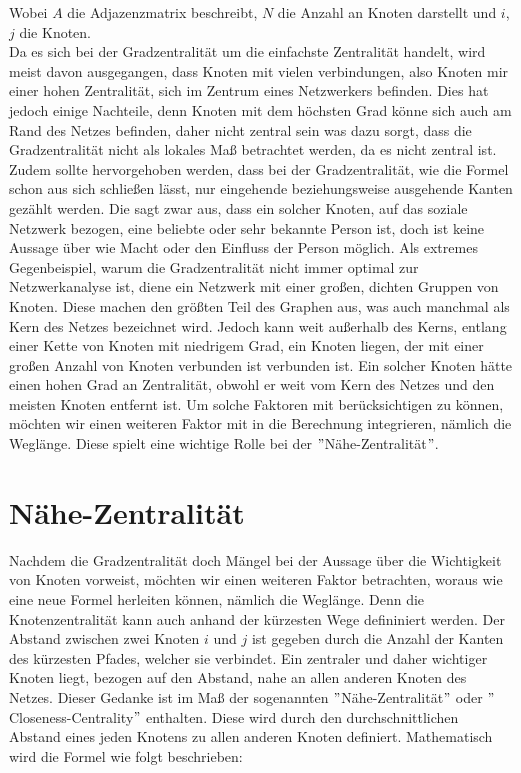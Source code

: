 Wobei $A$ die Adjazenzmatrix beschreibt, $N$ die Anzahl an Knoten darstellt und $i$, $j$ die Knoten. \\
Da es sich bei der Gradzentralität um die einfachste Zentralität handelt, wird meist davon ausgegangen, dass Knoten mit vielen verbindungen, also Knoten mir einer hohen Zentralität, sich im Zentrum eines Netzwerkers befinden. Dies hat jedoch einige Nachteile, denn Knoten mit dem höchsten Grad könne sich auch am Rand des Netzes befinden, daher nicht zentral sein was dazu sorgt, dass die Gradzentralität nicht als lokales Maß betrachtet werden, da es nicht zentral ist. Zudem sollte hervorgehoben werden, dass bei der Gradzentralität, wie die Formel schon aus sich schließen lässt, nur eingehende beziehungsweise ausgehende Kanten gezählt werden. Die sagt zwar aus, dass ein solcher Knoten, auf das soziale Netzwerk bezogen, eine beliebte oder sehr bekannte Person ist, doch ist keine Aussage über wie Macht oder den Einfluss der Person möglich. Als extremes Gegenbeispiel, warum die Gradzentralität nicht immer optimal zur Netzwerkanalyse ist, diene ein Netzwerk mit einer großen, dichten Gruppen von Knoten. Diese machen den größten Teil des Graphen aus, was auch manchmal als Kern des Netzes bezeichnet wird. Jedoch kann weit außerhalb des Kerns, entlang einer Kette von Knoten mit niedrigem Grad, ein Knoten liegen, der mit einer großen Anzahl von Knoten verbunden ist
verbunden ist. Ein solcher Knoten hätte einen hohen Grad an
Zentralität, obwohl er weit vom Kern des Netzes und den meisten Knoten entfernt ist. 
Um solche Faktoren mit berücksichtigen zu können, möchten wir einen weiteren Faktor mit in die Berechnung integrieren, nämlich die Weglänge. Diese spielt eine wichtige Rolle bei der $"$Nähe-Zentralität$"$.  
\section{Nähe-Zentralität}
Nachdem die Gradzentralität doch Mängel bei der Aussage über die Wichtigkeit von Knoten vorweist, möchten wir einen weiteren Faktor betrachten, woraus wie eine neue Formel herleiten können, nämlich die Weglänge. Denn die Knotenzentralität kann auch anhand der kürzesten Wege defininiert werden. Der Abstand zwischen zwei Knoten $i$ und $j$ ist gegeben durch die Anzahl der Kanten des kürzesten Pfades, welcher sie verbindet. Ein zentraler und daher wichtiger Knoten liegt, bezogen auf den Abstand, nahe an allen anderen Knoten des Netzes. Dieser Gedanke ist im Maß der sogenannten $"$Nähe-Zentralität$"$ oder $"$Closeness-Centrality$"$ enthalten. Diese wird durch den durchschnittlichen Abstand eines jeden Knotens zu allen anderen Knoten definiert. Mathematisch wird die Formel wie folgt beschrieben: 

